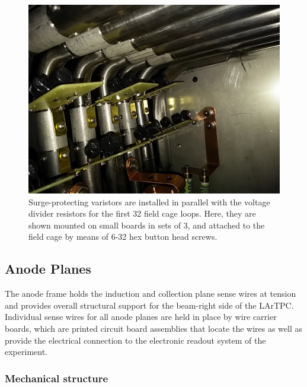 \begin{figure}
\centering	
\includegraphics[width=0.8\linewidth]{figures/tpc-voltage-divider-varistors.jpg}
\caption{Surge-protecting varistors are installed in parallel with the voltage divider resistors for the first 32 field cage loops. Here, they are shown mounted on small boards in sets of 3, and attached to the field cage by means of 6-32 hex button head screws.}
\label{fig:tpc-voltage-divider-varistors}
\end{figure}





\subsection{Anode Planes}

The anode frame holds the induction and collection plane sense wires at tension and provides overall structural support for the beam-right side of the LArTPC.  Individual sense wires for all anode planes are held in place by wire carrier boards, which are printed circuit board assemblies that locate the wires as well as provide the electrical connection to the electronic readout system of the experiment.

\subsubsection{Mechanical structure}

